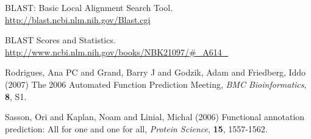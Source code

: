 \documentclass{bioinfo}
\begin{document}
\begin{thebibliography}{}

 BLAST: Basic Local Alignment Search Tool. \href{http://blast.ncbi.nlm.nih.gov/Blast.cgi}{http://blast.ncbi.nlm.nih.gov/Blast.cgi}

 BLAST Scores and Statistics. \href{http://www.ncbi.nlm.nih.gov/books/NBK21097/\#\_A614\_}{http://www.ncbi.nlm.nih.gov/books/NBK21097/\#\_A614\_}

 Rodrigues, Ana PC and Grand, Barry J and Godzik, Adam and Friedberg, Iddo (2007) The 2006 Automated Function Prediction Meeting, {\it BMC Bioinformatics}, {\bf 8}, S1. %

 Sasson, Ori and Kaplan, Noam and Linial, Michal (2006) Functional annotation prediction: All for one and one for all, {\it Protein Science}, {\bf 15}, 1557-1562.

%
%
%
%
%
%

\end{thebibliography}
\end{document}
